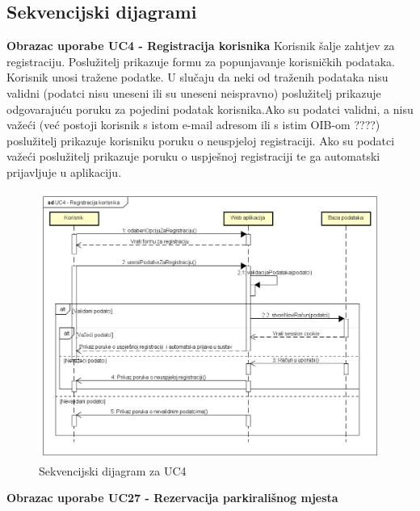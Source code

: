 \subsection{Sekvencijski dijagrami}

\textbf{Obrazac uporabe UC4 - Registracija korisnika}\newline
Korisnik šalje zahtjev za registraciju. Poslužitelj prikazuje formu za popunjavanje korisničkih podataka. Korisnik unosi tražene podatke. U slučaju da neki od traženih podataka nisu validni (podatci nisu uneseni ili su uneseni neispravno) poslužitelj prikazuje odgovarajuću poruku za pojedini podatak korisnika.Ako su podatci validni, a nisu važeći (već postoji korisnik s istom e-mail adresom ili s istim OIB-om ????) poslužitelj prikazuje korisniku poruku o neuspjeloj registraciji. Ako su podatci važeći poslužitelj prikazuje poruku o uspješnoj registraciji te ga automatski prijavljuje u aplikaciju.\newline
\begin{figure}[H]
	\includegraphics[width=1\linewidth]{dijagrami/UC4 - Registracija korisnika.png} %
	\caption{Sekvencijski dijagram za UC4}
	\label{fig:promjene2} %
\end{figure}
\pagebreak
\textbf{Obrazac uporabe UC27 - Rezervacija parkirališnog mjesta}\newline
